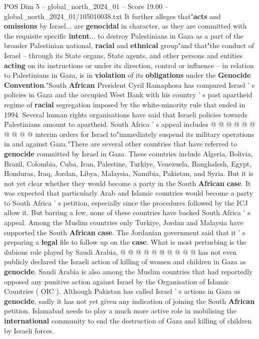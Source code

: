 \begin{textsample}{POS Dim 5 – global\_north\_2024\_01 – Score 19.00 – global\_north\_2024\_01/105010038.txt}
It further alleges that"\textbf{acts} and \textbf{omissions} by Israel... are \textbf{genocidal} in character, as they are committed with the requisite specific \textbf{intent}... to destroy Palestinians in Gaza as a part of the broader Palestinian national, \textbf{racial} and \textbf{ethnical} group"and that"the conduct of Israel -- through its State organs, State agents, and other persons and entities \textbf{acting} on its instructions or under its direction, control or influence -- in relation to Palestinians in Gaza, is in \textbf{violation} of its \textbf{obligations} under the \textbf{Genocide} \textbf{Convention}."South \textbf{African} President Cyril Ramaphosa has compared Israel ' s policies in Gaza and the occupied West Bank with his country ' s past apartheid regime of \textbf{racial} segregation imposed by the white-minority rule that ended in 1994.
Several human rights organisations have said that Israeli policies towards Palestinians amount to apartheid.
South Africa ' s appeal includes @ @ @ @ @ @ @ @ @ @ interim orders for Israel to"immediately suspend its military operations in and against Gaza."There are several other countries that have referred to \textbf{genocide} committed by Israel in Gaza.
These countries include Algeria, Bolivia, Brazil, Colombia, Cuba, Iran, Palestine, Turkiye, Venezuela, Bangladesh, Egypt, Honduras, Iraq, Jordan, Libya, Malaysia, Namibia, Pakistan, and Syria.
But it is not yet clear whether they would become a party in the South \textbf{African} \textbf{case}.
It was expected that particularly Arab and Islamic countries would become a party to South Africa ' s petition, especially since the procedures followed by the ICJ allow it.
But barring a few, none of these countries have backed South Africa ' s appeal.
Among the Muslim countries only Turkiye, Jordan and Malaysia have supported the South \textbf{African} \textbf{case}.
The Jordanian government said that it ' s preparing a \textbf{legal} file to follow up on the \textbf{case}.
What is most perturbing is the dubious role played by Saudi Arabia, @ @ @ @ @ @ @ @ @ @ has not even publicly declared the Israeli action of killing of women and children in Gaza as \textbf{genocide}.
Saudi Arabia is also among the Muslim countries that had reportedly opposed any punitive action against Israel by the Organisation of Islamic Countries ( OIC ).
Although Pakistan has called Israel ' s actions in Gaza as \textbf{genocide}, sadly it has not yet given any indication of joining the South \textbf{African} petition.
Islamabad needs to play a much more active role in mobilising the \textbf{international} community to end the destruction of Gaza and killing of children by Israeli forces.

\end{textsample}
